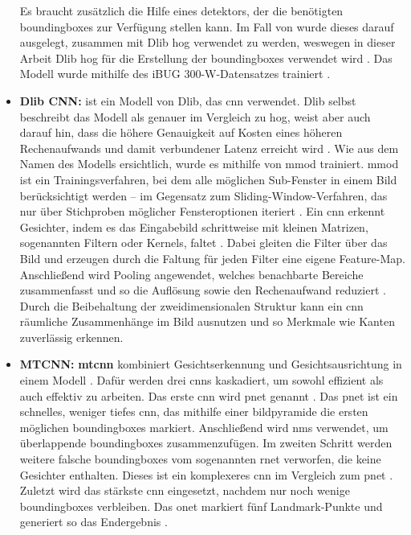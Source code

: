 \begin{itemize}
Es braucht zusätzlich die Hilfe eines \gls{detektor}s, der die benötigten \gls{boundingbox}es zur Verfügung stellen kann. Im Fall von  wurde dieses darauf ausgelegt, zusammen mit Dlib \gls{hog} verwendet zu werden, weswegen in dieser Arbeit Dlib \gls{hog} für die Erstellung der \gls{boundingbox}es verwendet wird \parencite{King24}. Das Modell wurde mithilfe des iBUG 300-W-Datensatzes trainiert \parencite{King24, faceLandmarkDetectionoD}.
%
	\item \textbf{Dlib CNN:}  ist ein Modell von Dlib, das \gls{cnn} verwendet. Dlib selbst beschreibt das Modell als genauer im Vergleich zu \gls{hog}, weist aber auch darauf hin, dass die höhere Genauigkeit auf Kosten eines höheren Rechenaufwands und damit verbundener Latenz erreicht wird \parencite{cnnFaceDetectoroD}. Wie aus dem Namen des Modells ersichtlich, wurde es mithilfe von \gls{mmod} trainiert. \gls{mmod} ist ein Trainingsverfahren, bei dem alle möglichen Sub-Fenster in einem Bild berücksichtigt werden – im Gegensatz zum Sliding-Window-Verfahren, das nur über Stichproben möglicher Fensteroptionen iteriert \parencite{King15}. Ein \gls{cnn} erkennt Gesichter, indem es das Eingabebild schrittweise mit kleinen Matrizen, sogenannten Filtern oder Kernels, faltet \parencite{GeeksforGeeks25}. Dabei gleiten die Filter über das Bild und erzeugen durch die Faltung für jeden Filter eine eigene Feature-Map. Anschließend wird Pooling angewendet, welches benachbarte Bereiche zusammenfasst und so die Auflösung sowie den Rechenaufwand reduziert \parencite{GeeksforGeeks25}. Durch die Beibehaltung der zweidimensionalen Struktur kann ein \gls{cnn} räumliche Zusammenhänge im Bild ausnutzen und so Merkmale wie Kanten zuverlässig erkennen.
%	
	\item \textbf{MTCNN:} \textbf{\gls{mtcnn}} kombiniert Gesichtserkennung und Gesichtsausrichtung in einem Modell \parencite{ZhangZL016}. Dafür werden drei \gls{cnn}s kaskadiert, um sowohl effizient als auch effektiv zu arbeiten. Das erste \gls{cnn} wird \gls{pnet} genannt \parencite{ZhangZL016}. Das \gls{pnet} ist ein schnelles, weniger tiefes \gls{cnn}, das mithilfe einer \gls{bildpyramide} die ersten möglichen \gls{boundingbox}es markiert. Anschließend wird \gls{nms} verwendet, um überlappende \gls{boundingbox}es zusammenzufügen. Im zweiten Schritt werden weitere falsche \gls{boundingbox}es vom sogenannten \gls{rnet} verworfen, die keine Gesichter enthalten. Dieses ist ein komplexeres \gls{cnn} im Vergleich zum \gls{pnet} \parencite{ZhangZL016}. Zuletzt wird das stärkste \gls{cnn} eingesetzt, nachdem nur noch wenige \gls{boundingbox}es verbleiben. Das \gls{onet} markiert fünf Landmark-Punkte und generiert so das Endergebnis \parencite{ZhangZL016}.

\end{itemize}
